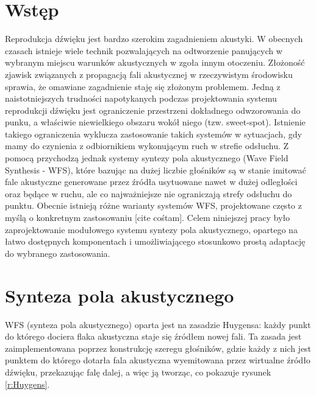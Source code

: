 \documentclass[12pt]{oska}
\affiliation{Akademia Górniczo-Hutnicza im. Stanisława Staszica w Krakowie}
\begin{document}
\maketitles

\section{Wstęp}

Reprodukcja dźwięku jest bardzo szerokim zagadnieniem akustyki. W obecnych
czasach istnieje wiele technik pozwalających na odtworzenie panujących w
wybranym miejscu warunków akustycznych w zgoła innym otoczeniu. Złożoność
zjawisk związanych z propagacją fali akustycznej w rzeczywistym środowisku
sprawia, że omawiane zagadnienie staję się złożonym problemem. Jedną z
naistotniejszych trudności napotykanych podczas projektowania systemu
reprodukcji dźwięku jest ograniczenie przestrzeni dokładnego odwzorowania do
punku, a właściwie niewielkiego obszaru wokół niego (tzw. sweet-spot).
Istnienie takiego ograniczenia wyklucza zastosowanie takich systemów w
sytuacjach, gdy mamy do czynienia z odbiornikiem wykonującym ruch w strefie
odsłuchu. Z pomocą przychodzą jednak systemy syntezy pola akustycznego (Wave
Field Synthesis - WFS), które bazując na dużej liczbie głośników są w stanie
imitować fale akustyczne generowane przez źródła usytuowane nawet w dużej
odległości oraz będące w ruchu, ale co najważniejsze nie ograniczają strefy
odsłuchu do punktu. Obecnie istnieją różne warianty systemów WFS, projektowane
często z myślą o konkretnym zastosowaniu [cite cośtam]. Celem niniejszej pracy
było zaprojektowanie modułowego systemu syntezy pola akustycznego, opartego na
łatwo dostępnych komponentach i umożliwiającego stosunkowo prostą adaptację do
wybranego zastosowania.

\section{Synteza pola akustycznego}

WFS (synteza pola akustycznego) oparta jest na zasadzie Huygensa: każdy punkt
do którego dociera flaka akustyczna staje się źródłem nowej fali. Ta zasada
jest zaimplementowana poprzez konstrukcję szeregu głośników, gdzie każdy z nich
jest punktem do którego dotarła fala akustyczna wyemitowana przez wirtualne
źródło dźwięku, przekazując falę dalej, a więc ją tworząc, co pokazuje rysunek
\ref{r:Huygens}.
\end{document}
